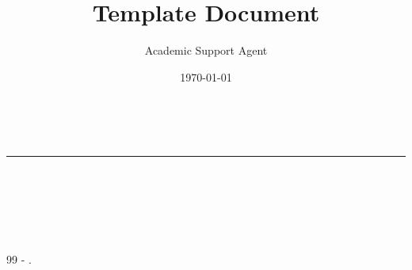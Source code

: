 \documentclass{article}
\title{Template Document}
\author{Academic Support Agent}
\date{\today}
\begin{document}
\maketitle


\section{ }

\noindent
\textbf{ }\\
	 	

	 
	\vspace*{10zw}	%

\noindent
\rule{\linewidth}{1pt}\\
\noindent
\textbf{ }
\JSPSInstructions	%

\textbf{\\ \\
 \\
 }

	  

	 

	\vspace{1cm}
	\begin{thebibliography}{99}
		   -  .
	\end{thebibliography}




\section{ }

		 

	 

	 



\end{document}
